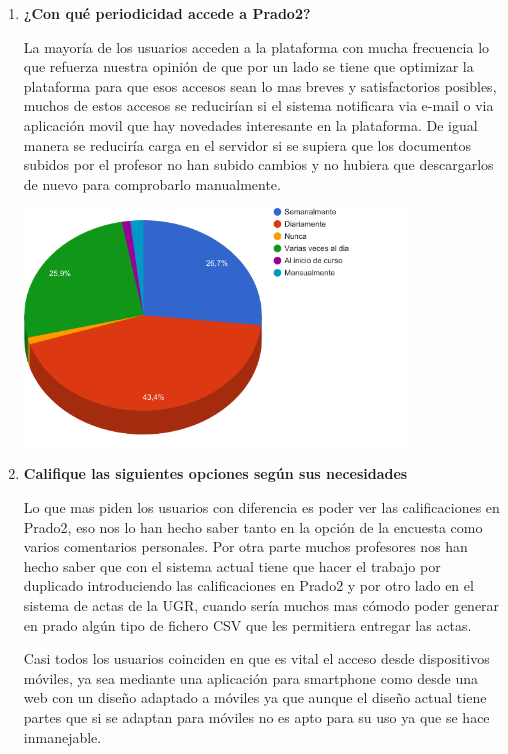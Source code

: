 \begin{enumerate}
  \item \textbf{¿Con qué periodicidad accede a Prado2?} 
  
  La mayoría de los usuarios acceden a la plataforma con mucha frecuencia lo que refuerza nuestra opinión de que por un lado se tiene que optimizar la plataforma para que esos accesos sean lo mas breves y satisfactorios posibles, muchos de estos accesos se reducirían si el sistema notificara via e-mail o via aplicación movil que hay novedades interesante en la plataforma. De igual manera se reduciría carga en el servidor si se supiera que los documentos subidos por el profesor no han subido cambios y no hubiera que descargarlos de nuevo para comprobarlo manualmente.

  
  
  \includegraphics[width=0.8\textwidth]{../charts/03_periodicidad}

  
  \item \textbf{Califique las siguientes opciones según sus necesidades} 

Lo que mas piden los usuarios con diferencia es poder ver las calificaciones en Prado2, eso nos lo han hecho saber tanto en la opción de la encuesta como varios comentarios personales. Por otra parte muchos profesores nos han hecho saber que con el sistema actual tiene que hacer el trabajo por duplicado introduciendo las calificaciones en Prado2 y por otro lado en el sistema de actas de la UGR, cuando sería muchos mas cómodo poder generar en prado algún tipo de fichero CSV que les permitiera entregar las actas.

  
Casi todos los usuarios coinciden en que es vital el acceso desde dispositivos móviles, ya sea mediante una aplicación para smartphone como desde una web con un diseño adaptado a móviles ya que aunque el diseño actual tiene partes que si se adaptan para móviles no es apto para su uso ya que se hace inmanejable.


\end{enumerate}
